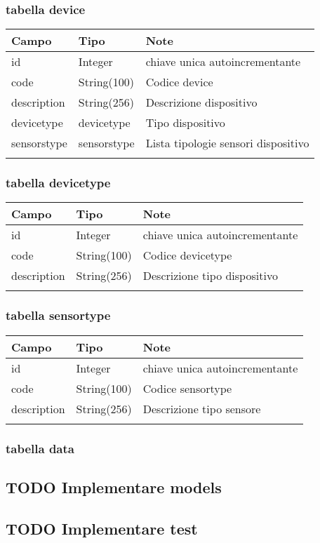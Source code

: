 \documentclass[11pt]{article}
\begin{document}
\subsubsection{tabella device}
\label{sec-3-2-1}
\begin{center}
\begin{tabular}{lll}
Campo & Tipo & Note\\
\hline
id & Integer & chiave unica autoincrementante\\
code & String(100) & Codice device\\
description & String(256) & Descrizione dispositivo\\
devicetype & devicetype & Tipo dispositivo\\
sensorstype & sensorstype & Lista tipologie sensori dispositivo\\
 &  & \\
\end{tabular}
\end{center}
\subsubsection{tabella devicetype}
\label{sec-3-2-2}
\begin{center}
\begin{tabular}{lll}
Campo & Tipo & Note\\
\hline
id & Integer & chiave unica autoincrementante\\
code & String(100) & Codice devicetype\\
description & String(256) & Descrizione tipo dispositivo\\
 &  & \\
\end{tabular}
\end{center}
\subsubsection{tabella sensortype}
\label{sec-3-2-3}
\begin{center}
\begin{tabular}{lll}
Campo & Tipo & Note\\
\hline
id & Integer & chiave unica autoincrementante\\
code & String(100) & Codice sensortype\\
description & String(256) & Descrizione tipo sensore\\
 &  & \\
\end{tabular}
\end{center}
\subsubsection{tabella data}
\label{sec-3-2-4}

\subsection{{\bfseries\sffamily TODO} Implementare models}
\label{sec-3-3}
\subsection{{\bfseries\sffamily TODO} Implementare test}
\label{sec-3-4}
\end{document}
